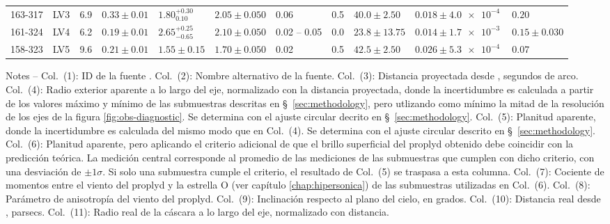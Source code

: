 \begin{landscape}
\begin{table}
\begin{adjustbox}{width=1.35\textwidth}
\begin{tabular}{llrllllrlll}
  163-317  & LV3      &   6.9  &  $0.33 \pm 0.01$  &  $1.80^{+0.30}_{0.10}$   &  $2.05 \pm 0.050$     &  0.06  &  0.5  &  $40.0 \pm 2.50$   &  $0.018 \pm \SI{4.0e-4}{}$  &  $0.20$  \\
 161-324  & LV4      &   6.2  &  $0.19 \pm 0.01$  &  $2.65^{+0.25}_{-0.65}$   &  $2.10 \pm 0.050$     &  0.02 -- 0.05  &  0.0  &  $23.8 \pm 13.75$  &  $0.014 \pm \SI{1.7e-3}{}$  &  $0.15 \pm 0.030$  \\
 158-323  & LV5      &   9.6  &  $0.21 \pm 0.01$  &  $1.55 \pm 0.15$   &  $1.70 \pm 0.050$     &  0.02  &  0.5  &  $42.5 \pm 2.50$   &  $0.026 \pm \SI{5.3e-4}{}$  &  $0.07$  \\
\bottomrule
\end{tabular}
\end{adjustbox}
\begin{minipage}{0.95\linewidth}
\footnotesize
  Notes --
%
  Col.~(1): ID de la fuente \citep{ODell:1994a}.
%
  Col.~(2): Nombre alternativo de la fuente.
% 
  Col.~(3): Distancia proyectada desde \thC{}, segundos de arco.
%
  Col.~(4): Radio exterior aparente a lo largo del eje, normalizado con la distancia proyectada, donde la incertidumbre es calculada a partir de los valores máximo y mínimo de las submuestras descritas en \S~\ref{sec:methodology}, pero utlizando como mínimo la mitad de la resolución de los ejes de la figura \ref{fig:obs-diagnostic}. Se determina con el ajuste circular decrito en \S~\ref{sec:methodology}.
% 
  Col.~(5): Planitud aparente, donde la incertidumbre es calculada del mismo modo que en Col.~(4). Se determina con el ajuste circular descrito en \S~\ref{sec:methodology}.
% 
  Col.~(6): Planitud aparente, pero aplicando el criterio adicional de que el brillo superficial del proplyd obtenido debe coincidir con la predicción teórica. La medición central corresponde al promedio de las mediciones de las submuestras que cumplen con dicho criterio, con una desviación de $\pm 1\sigma$. Si solo una submuestra cumple el criterio, el resultado de Col.~(5) se traspasa a esta columna. 
%
  Col.~(7): Cociente de momentos entre el viento del proplyd y la estrella O (ver capítulo \ref{chap:hipersonica}) de las submuestras utilizadas en Col.~(6). 
% 
  Col.~(8): Parámetro de anisotropía del viento del proplyd.
% 
  Col.~(9): Inclinación respecto al plano del cielo, en grados.
% 
  Col.~(10): Distancia real desde \thC{}, parsecs.
%
  Col.~(11): Radio real de la cáscara a lo largo del eje, normalizado con distancia.

\end{minipage}
\end{table}
\end{landscape}

